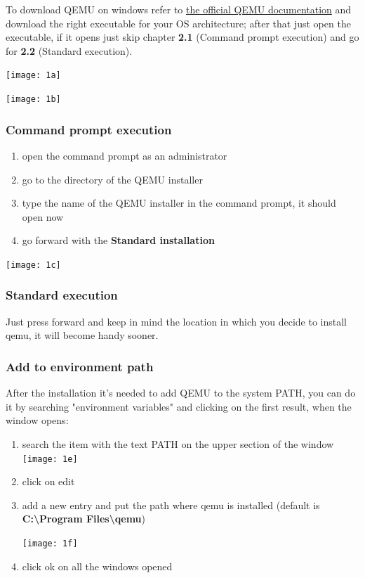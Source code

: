 \documentclass{exam}
\begin{document}
To download QEMU on windows refer to \href{https://www.qemu.org/download/#windows}{the official QEMU documentation} and download the right executable for your OS architecture; after that just open the executable, if it opens just skip chapter \textbf{2.1} (Command prompt execution) and go for \textbf{2.2} (Standard execution).

 \texttt{[image: 1a]}

 \texttt{[image: 1b]}

\subsubsection {Command prompt execution} 
\begin{enumerate}
\item open the command prompt as an administrator
\item go to the directory of the QEMU installer
\item type the name of the QEMU installer in the command prompt, it should open now
\item go forward with the \textbf{Standard installation}
\end{enumerate}


 \texttt{[image: 1c]}

\subsubsection{Standard execution} 

Just press forward and keep in mind the location in which you decide to install qemu, it will become handy sooner.

\subsubsection {Add to environment path} 
After the installation it's needed to add QEMU to the system PATH, you can do it by searching "environment variables" and clicking on the first result, when the window opens:

\begin{enumerate}
    \item search the item with the text PATH on the upper section of the window 
     \texttt{[image: 1e]}
    \item click on edit
    \item add a new entry and put the path where qemu is installed (default is \textbf{C:\textbackslash Program Files\textbackslash qemu})
    
    \texttt{[image: 1f]}
    
    \item click ok on all the windows opened
\end{enumerate}
\end{document}
